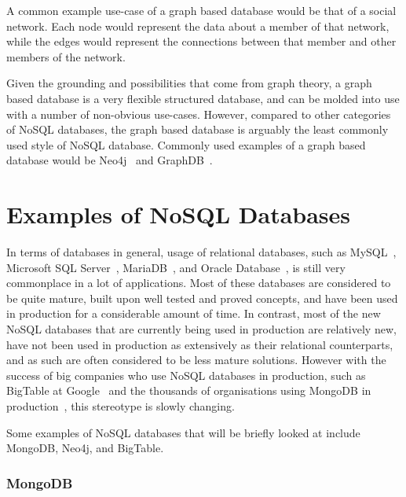 \documentclass{article}
\begin{document}
A common example use-case of a graph based database would be that of a social network. Each node
would represent the data about a member of that network, while the edges would represent the
connections between that member and other members of the network.

Given the grounding and possibilities that come from graph theory, a graph based database is
a very flexible structured database, and can be molded into use with a number of non-obvious
use-cases. However, compared to other categories of NoSQL databases, the graph based database
is arguably the least commonly used style of NoSQL database. Commonly used examples of
a graph based database would be Neo4j~\cite{2_neo4j} and GraphDB~\cite{1_ontotext_2015}.






\section{Examples of NoSQL Databases} %
\label{sec:examples_of_nosql_databases}

In terms of databases in general, usage of relational databases, such as MySQL~\cite{1_mysqlcom_2015},
Microsoft SQL Server~\cite{4_microsoftcom_2015}, MariaDB~\cite{2_mariadborg_2015}, and Oracle Database~\cite{3_oraclecom_2015}, is still
very commonplace in a lot of applications. Most of these databases are considered to be quite mature, built upon well
tested and proved concepts, and have been used in production for a considerable amount of time. In contrast, most of
the new NoSQL databases that are currently being used in production are relatively new, have not been used in production
as extensively as their relational counterparts, and as such are often considered to be less mature solutions. However
with the success of big companies who use NoSQL databases in production, such as BigTable at Google~\cite{chang2008bigtable}
and the thousands of organisations using MongoDB in production~\cite{mongo_customers}, this stereotype is slowly changing.

Some examples of NoSQL databases that will be briefly looked at include MongoDB, Neo4j, and BigTable.

\subsubsection{MongoDB} %
\label{ssub:mongodb}
\end{document}
